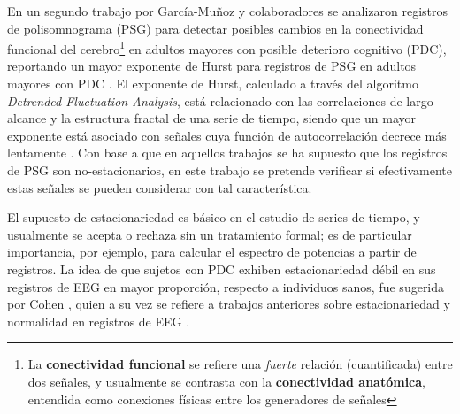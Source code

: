 En un segundo trabajo por García-Muñoz y colaboradores \cite{Valeria} se analizaron 
registros de polisomnograma (PSG) 
para detectar posibles cambios en la conectividad funcional del cerebro\footnote{La 
\textbf{conectividad funcional} se refiere una \textit{fuerte} relación (cuantificada) entre dos 
señales, y usualmente se contrasta con la \textbf{conectividad anatómica}, entendida como conexiones 
físicas entre los generadores de señales} en adultos mayores con posible deterioro 
cognitivo (PDC), reportando un mayor exponente de Hurst para registros de PSG en adultos mayores 
con PDC \cite{Valeria}.
El exponente de Hurst, calculado a través del algoritmo \textit{Detrended Fluctuation Analysis}, 
está relacionado con las correlaciones de largo alcance y la estructura fractal de una serie de 
tiempo, siendo que un mayor exponente está asociado con señales cuya función de 
autocorrelación decrece más lentamente \cite{Rodriguez11}.
Con base a que en aquellos trabajos se ha supuesto que los registros de PSG son no-estacionarios, 
en este trabajo se pretende verificar si efectivamente estas señales se pueden considerar con tal
característica.

El supuesto de estacionariedad es básico en el estudio de series de tiempo, y usualmente se 
acepta o rechaza sin un tratamiento formal; es de particular importancia, por ejemplo, para 
calcular el espectro de potencias a partir de registros.
La idea de que sujetos con PDC exhiben estacionariedad débil en sus registros de EEG en mayor 
proporción, respecto a individuos sanos, fue sugerida por Cohen \cite{Cohen77}, quien a su vez se 
refiere a trabajos anteriores sobre estacionariedad y normalidad en registros de EEG 
\cite{McEwen75,Sugimoto78,Kawabata73}.




